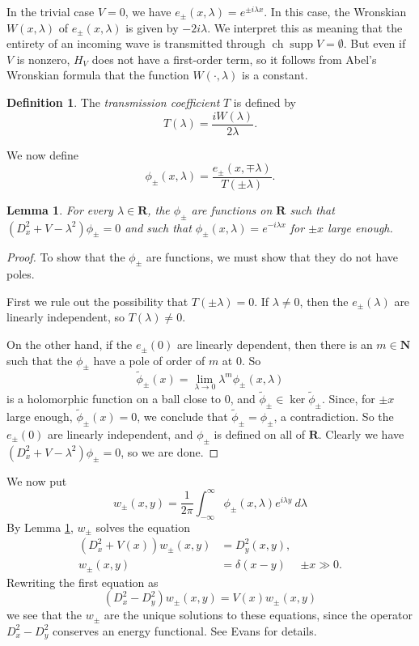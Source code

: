 \documentclass[12pt]{report}
\newcommand{\NN}{\mathbf{N}}
\newcommand{\RR}{\mathbf{R}}
\DeclareMathOperator{\ch}{ch}
\DeclareMathOperator{\supp}{supp}
\newcommand{\dfn}[1]{\emph{#1}\index{#1}}
\newtheorem{lemma}[theorem]{Lemma}
\theoremstyle{definition}
\newtheorem{definition}[theorem]{Definition}
\begin{document}
In the trivial case $V = 0$, we have $e_\pm(x, \lambda) = e^{\pm i\lambda x}$. In this case, the Wronskian $W(x, \lambda)$ of $e_\pm(x, \lambda)$ is given by $-2i\lambda$. We interpret this as meaning that the entirety of an incoming wave is transmitted through $\ch \supp V = \emptyset$. But even if $V$ is nonzero, $H_V$ does not have a first-order term, so it follows from Abel's Wronskian formula that the function $W(\cdot, \lambda)$ is a constant.

\begin{definition}
The \dfn{transmission coefficient} $T$ is defined by
$$T(\lambda) = \frac{iW(\lambda)}{2\lambda}.$$
\end{definition}

We now define
$$\phi_\pm(x, \lambda) = \frac{e_\pm(x, \mp \lambda)}{T(\pm \lambda)}.$$

\begin{lemma}
\label{construction of intertwining, part 1}
For every $\lambda \in \RR$, the $\phi_\pm$ are functions on $\RR$ such that $(D_x^2 + V - \lambda^2)\phi_\pm = 0$ and such that $\phi_\pm(x, \lambda) = e^{-i\lambda x}$ for $\pm x$ large enough.
\end{lemma}
\begin{proof}
To show that the $\phi_\pm$ are functions, we must show that they do not have poles.

First we rule out the possibility that $T(\pm \lambda) = 0$. If $\lambda \neq 0$, then the $e_\pm(\lambda)$ are linearly independent,
so $T(\lambda) \neq 0$.

On the other hand, if the $e_\pm(0)$ are linearly dependent, then there is an $m \in \NN$ such that the $\phi_\pm$ have a pole of order of $m$ at $0$. So
$$\tilde \phi_\pm(x) = \lim_{\lambda \to 0} \lambda^m\phi_\pm(x, \lambda)$$
is a holomorphic function on a ball close to $0$, and $\tilde \phi_\pm \in \ker \tilde \phi_\pm$. Since, for $\pm x$ large enough, $\tilde \phi_\pm(x) = 0$, we conclude that $\tilde \phi_\pm = \phi_\pm$, a contradiction. So the $e_\pm(0)$ are linearly independent, and $\phi_\pm$ is defined on all of $\RR$. Clearly we have $(D_x^2 + V - \lambda^2)\phi_\pm = 0$, so we are done.
\end{proof}

We now put
$$w_\pm(x, y) = \frac{1}{2\pi} \int_{-\infty}^\infty \phi_\pm(x, \lambda)e^{i\lambda y} ~d\lambda$$
By Lemma \ref{construction of intertwining, part 1}, $w_\pm$ solves the equation
\begin{align*}
  (D_x^2 + V(x))w_\pm(x, y) &= D_y^2(x, y),\\
  w_\pm(x, y) &= \delta(x - y) &\pm x \gg 0.
\end{align*}
Rewriting the first equation as
$$(D_x^2 - D_y^2)w_\pm(x, y) = V(x)w_\pm(x, y)$$
we see that the $w_\pm$ are the unique solutions to these equations, since the operator $D_x^2 - D_y^2$ conserves an energy functional. See Evans \cite[\S2.4.3]{evans10} for details.
\end{document}
